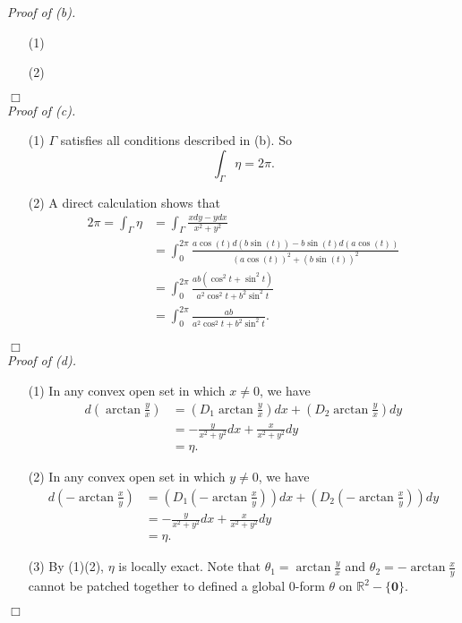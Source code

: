\documentclass{article}
\begin{document}
\emph{Proof of (b).}
\begin{enumerate}
\item[(1)]
\item[(2)]

\end{enumerate}
$\Box$ \\



\emph{Proof of (c).}
\begin{enumerate}
\item[(1)]
  $\Gamma$ satisfies all conditions described in (b).
  So
  \[
    \int_{\Gamma} \eta = 2\pi.
  \]

\item[(2)]
  A direct calculation shows that
  \begin{align*}
    2\pi = \int_{\Gamma} \eta
    &= \int_{\Gamma} \frac{x dy - y dx}{x^2+y^2} \\
    &= \int_{0}^{2\pi}
      \frac{a \cos(t) d(b \sin(t)) - b \sin(t) d(a \cos(t))}{(a \cos(t))^2+(b \sin(t))^2} \\
    &= \int_{0}^{2\pi}
      \frac{ab (\cos^2 t + \sin^2 t)}{a^2\cos^2 t + b^2 \sin^2 t} \\
    &= \int_{0}^{2\pi}
      \frac{ab}{a^2\cos^2 t + b^2 \sin^2 t}.
  \end{align*}
\end{enumerate}
$\Box$ \\



\emph{Proof of (d).}
\begin{enumerate}
\item[(1)]
  In any convex open set in which $x \neq 0$,
  we have
  \begin{align*}
    d\left( \arctan\frac{y}{x} \right)
    &= \left( D_1\arctan\frac{y}{x} \right) dx
      + \left( D_2\arctan\frac{y}{x} \right) dy \\
    &= -\frac{y}{x^2+y^2} dx + \frac{x}{x^2+y^2} dy \\
    &= \eta.
  \end{align*}

\item[(2)]
  In any convex open set in which $y \neq 0$,
  we have
  \begin{align*}
    d\left( -\arctan\frac{x}{y} \right)
    &= \left( D_1\left(-\arctan\frac{x}{y}\right) \right) dx
      + \left( D_2\left(-\arctan\frac{x}{y}\right) \right) dy \\
    &= -\frac{y}{x^2+y^2} dx + \frac{x}{x^2+y^2} dy \\
    &= \eta.
  \end{align*}

\item[(3)]
  By (1)(2), $\eta$ is locally exact.
  Note that $\theta_1 = \arctan\frac{y}{x}$
  and $\theta_2 = -\arctan\frac{x}{y}$
  cannot be patched together to defined a global $0$-form $\theta$
  on $\mathbb{R}^2 - \{\mathbf{0}\}$.

\end{enumerate}
$\Box$ \\
\end{document}
